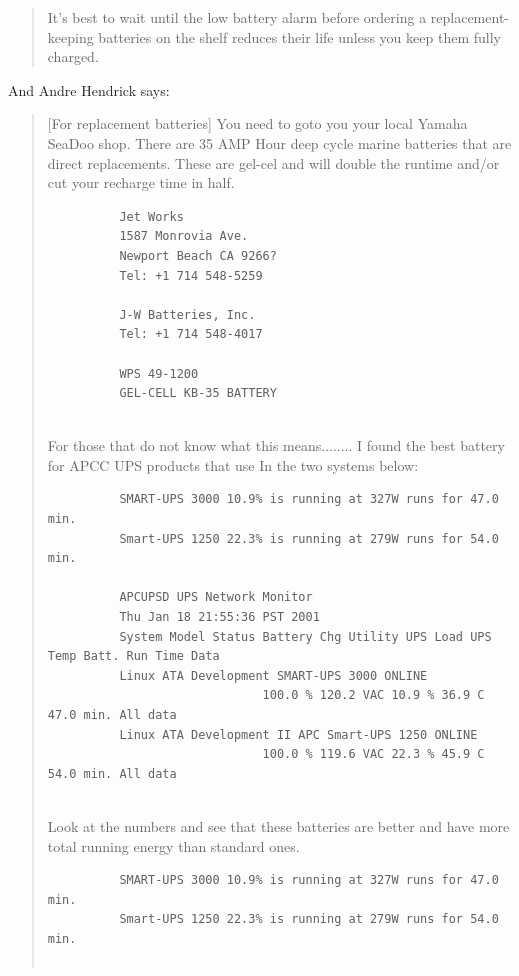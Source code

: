 {{{{{{{{\begin{quote}
It's best to wait until the low battery alarm before ordering a
replacement-keeping batteries on the shelf reduces their life unless you keep
them fully charged. 
\end{quote}

And Andre Hendrick says:  

\begin{quote}

[For replacement batteries] You need to goto you your local Yamaha SeaDoo
shop. There are 35 AMP Hour deep cycle marine batteries that are direct
replacements. These are gel-cel and will double the runtime and/or cut your
recharge time in half.  

\footnotesize
\begin{verbatim}
          Jet Works
          1587 Monrovia Ave.
          Newport Beach CA 9266?
          Tel: +1 714 548-5259
          
          J-W Batteries, Inc.
          Tel: +1 714 548-4017
          
          WPS 49-1200
          GEL-CELL KB-35 BATTERY
     
\end{verbatim}
\normalsize

For those that do not know what this means........ I found the best battery
for APCC UPS products that use In the two systems below:  

\footnotesize
\begin{verbatim}
          SMART-UPS 3000 10.9% is running at 327W runs for 47.0 min.
          Smart-UPS 1250 22.3% is running at 279W runs for 54.0 min.
          
          APCUPSD UPS Network Monitor
          Thu Jan 18 21:55:36 PST 2001
          System Model Status Battery Chg Utility UPS Load UPS Temp Batt. Run Time Data
          Linux ATA Development SMART-UPS 3000 ONLINE
                              100.0 % 120.2 VAC 10.9 % 36.9 C 47.0 min. All data
          Linux ATA Development II APC Smart-UPS 1250 ONLINE
                              100.0 % 119.6 VAC 22.3 % 45.9 C 54.0 min. All data
     
\end{verbatim}
\normalsize

Look at the numbers and see that these batteries are better and have more
total running energy than standard ones.  

\footnotesize
\begin{verbatim}
          SMART-UPS 3000 10.9% is running at 327W runs for 47.0 min.
          Smart-UPS 1250 22.3% is running at 279W runs for 54.0 min.
          

\end{verbatim}
\end{quote}}}}}}}}}

